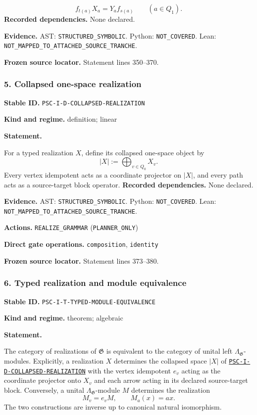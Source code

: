 \documentclass[a4paper,11pt]{article}
\newcommand{\field}[2]{\noindent\textbf{#1.} #2\par}
\begin{document}
\[
f_{t(a)}X_a=Y_af_{s(a)}
\qquad(a\in Q_1).
\]
\field{Recorded dependencies}{None declared.}
\field{Evidence}{AST: \nolinkurl{STRUCTURED_SYMBOLIC}. Python: \nolinkurl{NOT_COVERED}. Lean: \nolinkurl{NOT_MAPPED_TO_ATTACHED_SOURCE_TRANCHE}.}
\field{Frozen source locator}{Statement lines 350--370.}
\subsubsection*{5. Collapsed one-space realization}
\label{rec:PSC-I-D-COLLAPSED-REALIZATION}
\field{Stable ID}{\nolinkurl{PSC-I-D-COLLAPSED-REALIZATION}}
\field{Kind and regime}{definition; linear}
\textbf{Statement.}\par
For a typed realization $X$, define its collapsed one-space object by
\[
|X|:=\bigoplus_{v\in Q_0}X_v.
\]
Every vertex idempotent acts as a coordinate projector on $|X|$, and every path acts as a source-target block operator.
\field{Recorded dependencies}{None declared.}
\field{Evidence}{AST: \nolinkurl{STRUCTURED_SYMBOLIC}. Python: \nolinkurl{NOT_COVERED}. Lean: \nolinkurl{NOT_MAPPED_TO_ATTACHED_SOURCE_TRANCHE}.}
\field{Actions}{\nolinkurl{REALIZE_GRAMMAR} (\nolinkurl{PLANNER_ONLY})}
\field{Direct gate operations}{\nolinkurl{composition}, \nolinkurl{identity}}
\field{Frozen source locator}{Statement lines 373--380.}
\subsubsection*{6. Typed realization and module equivalence}
\label{rec:PSC-I-T-TYPED-MODULE-EQUIVALENCE}
\field{Stable ID}{\nolinkurl{PSC-I-T-TYPED-MODULE-EQUIVALENCE}}
\field{Kind and regime}{theorem; algebraic}
\textbf{Statement.}\par
The category of realizations of $\mathfrak G$ is equivalent to the category of unital left $\Lambda_{\mathfrak G}$-modules.  Explicitly, a realization $X$ determines the collapsed space $|X|$ of \hyperref[rec:PSC-I-D-COLLAPSED-REALIZATION]{\nolinkurl{PSC-I-D-COLLAPSED-REALIZATION}}
with the vertex idempotent $e_v$ acting as the coordinate projector onto $X_v$ and each arrow acting in its declared source-target block.  Conversely, a unital $\Lambda_{\mathfrak G}$-module $M$ determines the realization
\[
M_v=e_vM,
\qquad
M_a(x)=ax.
\]
The two constructions are inverse up to canonical natural isomorphism.
\end{document}
